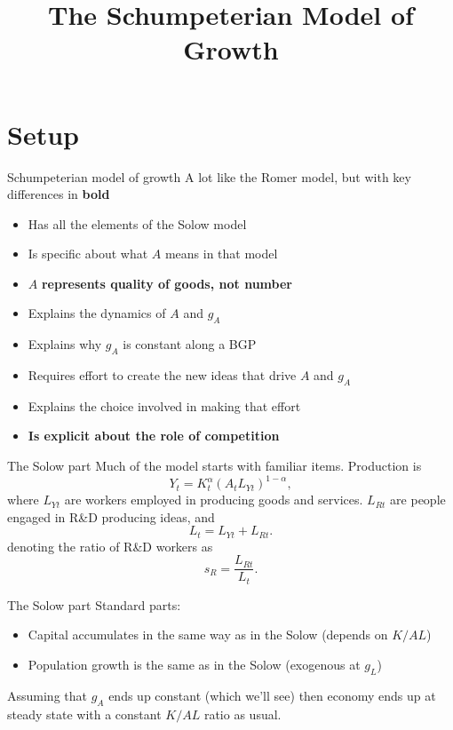 

\title[Schumpeter]{The Schumpeterian Model of Growth}


\maketitle

\section{Setup}
\begin{frame}{Schumpeterian model of growth}
A lot like the Romer model, but with key differences in \textbf{bold}
\begin{itemize}
	\item Has all the elements of the Solow model
	\item Is specific about what $A$ means in that model
	\item $A$ \textbf{represents quality of goods, not number}
	\item Explains the dynamics of $A$ and $g_A$
	\item Explains why $g_A$ is constant along a BGP
	\item Requires effort to create the new ideas that drive $A$ and $g_A$
	\item Explains the choice involved in making that effort
	\item \textbf{Is explicit about the role of competition}
\end{itemize}
\end{frame}

\begin{frame}{The Solow part}
Much of the model starts with familiar items. Production is
\begin{equation}
	Y_t = K_t^{\alpha}\left(A_t L_{Yt}\right)^{1-\alpha}, \nonumber
\end{equation}
where $L_{Yt}$ are workers employed in producing goods and services. $L_{Rt}$ are people engaged in R\&D producing ideas, and
\begin{equation}
	L_t = L_{Yt} + L_{Rt}.
\end{equation}
denoting the ratio of R\&D workers as
\begin{equation}
	s_R = \frac{L_{Rt}}{L_t}.
\end{equation}
\end{frame}

\begin{frame}{The Solow part}
Standard parts:
\begin{itemize}
	\item Capital accumulates in the same way as in the Solow (depends on $K/AL$)
	\item Population growth is the same as in the Solow (exogenous at $g_L$)
\end{itemize}
Assuming that $g_A$ ends up constant (which we'll see) then economy ends up at steady state with a constant $K/AL$ ratio as usual.
\end{frame}


